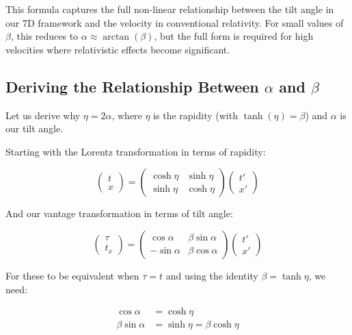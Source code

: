 \documentclass{article}
\begin{document}
This formula captures the full non-linear relationship between the tilt angle in our 7D framework and the velocity in conventional relativity. For small values of $\beta$, this reduces to $\alpha \approx \arctan(\beta)$, but the full form is required for high velocities where relativistic effects become significant.

\subsection{Deriving the Relationship Between $\alpha$ and $\beta$}

Let us derive why $\eta = 2\alpha$, where $\eta$ is the rapidity (with $\tanh(\eta) = \beta$) and $\alpha$ is our tilt angle.

Starting with the Lorentz transformation in terms of rapidity:

\begin{equation}
\begin{pmatrix} t \\ x \end{pmatrix} = 
\begin{pmatrix} \cosh\eta & \sinh\eta \\ \sinh\eta & \cosh\eta \end{pmatrix}
\begin{pmatrix} t' \\ x' \end{pmatrix}
\end{equation}

And our vantage transformation in terms of tilt angle:

\begin{equation}
\begin{pmatrix} \tau \\ t_x \end{pmatrix} = 
\begin{pmatrix} \cos\alpha & \beta\sin\alpha \\ -\sin\alpha & \beta\cos\alpha \end{pmatrix}
\begin{pmatrix} t' \\ x' \end{pmatrix}
\end{equation}

For these to be equivalent when $\tau = t$ and using the identity $\beta = \tanh\eta$, we need:

\begin{equation}
\begin{aligned}
\cos\alpha &= \cosh\eta \\
\beta\sin\alpha &= \sinh\eta = \beta\cosh\eta
\end{aligned}
\end{equation}
\end{document}

